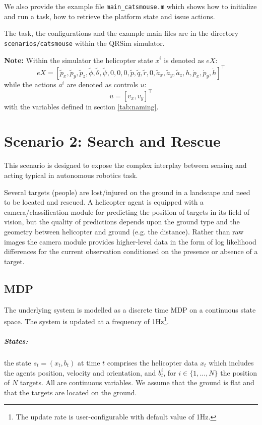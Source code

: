 \documentclass[a4paper,11pt]{report}
\newcommand{\sname}{QRSim\xspace}
\newcommand\mytexttt[1]{\texttt{\hyphenchar\font=45\relax #1}}
\begin{document}
We also provide the example file \texttt{main\_catsmouse.m} which shows how to initialize and run a task, how to retrieve the platform state
and issue actions.

The task, the configurations and the example main files are in the directory \mytexttt{scenarios/catsmouse} within the \sname simulator. 

\textbf{Note:}
Within the simulator the helicopter state $x^i$ is denoted as $eX$:
$$eX = [\tilde{p}_x,\tilde{p}_y,\tilde{p}_z,\tilde{\phi},\tilde{\theta},\tilde{\psi},0,0,0,\tilde{p},\tilde{q},\tilde{r},0,\tilde{a}_x,\tilde{a}_y,\tilde{a}_z,h,\dot{p}_x,\dot{p}_y,\dot{h}]^\intercal$$
while the actions $a^i$ are denoted as controls $u$:
$$u=[v_x,v_y]^\intercal$$
with the variables defined in section \ref{tab:naming}.


\newpage
\chapter{Scenario 2: Search and Rescue}
This scenario is designed to expose the complex interplay between sensing and acting typical in autonomous robotics task.

Several targets (people) are lost/injured on the ground in a landscape and need to be located and rescued. A helicopter agent is equipped with a camera/classification module for predicting the position of targets in its field of vision, but the quality of predictions depends upon the ground type and the geometry between helicopter and ground (e.g. the distance). Rather than raw images the camera module provides higher-level data in the form of log likelihood differences for the current observation conditioned on the presence or absence of a target.

\section{MDP}
The underlying system is modelled as a discrete time MDP on a continuous state space. The system is updated at a frequency of 1Hz\footnote{The update rate is user-configurable with default value of 1Hz.}. 

\paragraph{States:} the state $s_t=(x_t,b_t)$ at time $t$ comprises the helicopter data $x_t$ which includes the agents position, velocity and orientation, and $b^i_{t}$, for $i\in\{1,...,N\}$ the position of $N$ targets. All are continuous variables. We assume that the ground is flat and that the targets are located on the ground.
\end{document}

